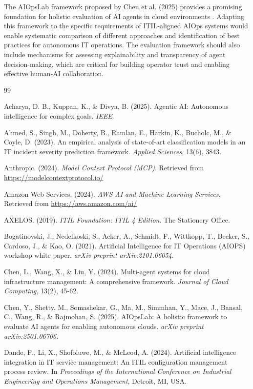 \documentclass{article}
\begin{document}
The AIOpsLab framework proposed by Chen et al. (2025) provides a promising foundation for holistic evaluation of AI agents in cloud environments \cite{chen2025}. Adapting this framework to the specific requirements of ITIL-aligned AIOps systems would enable systematic comparison of different approaches and identification of best practices for autonomous IT operations. The evaluation framework should also include mechanisms for assessing explainability and transparency of agent decision-making, which are critical for building operator trust and enabling effective human-AI collaboration.


\begin{thebibliography}{99}

Acharya, D. B., Kuppan, K., \& Divya, B. (2025). Agentic AI: Autonomous intelligence for complex goals. \textit{IEEE}.

Ahmed, S., Singh, M., Doherty, B., Ramlan, E., Harkin, K., Bucholc, M., \& Coyle, D. (2023). An empirical analysis of state-of-art classification models in an IT incident severity prediction framework. \textit{Applied Sciences}, 13(6), 3843.

Anthropic. (2024). \textit{Model Context Protocol (MCP)}. Retrieved from \url{https://modelcontextprotocol.io/}

Amazon Web Services. (2024). \textit{AWS AI and Machine Learning Services}. Retrieved from \url{https://aws.amazon.com/ai/}

AXELOS. (2019). \textit{ITIL Foundation: ITIL 4 Edition}. The Stationery Office.

Bogatinovski, J., Nedelkoski, S., Acker, A., Schmidt, F., Wittkopp, T., Becker, S., Cardoso, J., \& Kao, O. (2021). Artificial Intelligence for IT Operations (AIOPS) workshop white paper. \textit{arXiv preprint arXiv:2101.06054}.

Chen, L., Wang, X., \& Liu, Y. (2024). Multi-agent systems for cloud infrastructure management: A comprehensive framework. \textit{Journal of Cloud Computing}, 13(2), 45-62.

Chen, Y., Shetty, M., Somashekar, G., Ma, M., Simmhan, Y., Mace, J., Bansal, C., Wang, R., \& Rajmohan, S. (2025). AIOpsLab: A holistic framework to evaluate AI agents for enabling autonomous clouds. \textit{arXiv preprint arXiv:2501.06706}.

Dande, F., Li, X., Shofoluwe, M., \& McLeod, A. (2024). Artificial intelligence integration in IT service management: An ITIL configuration management process review. In \textit{Proceedings of the International Conference on Industrial Engineering and Operations Management}, Detroit, MI, USA.


\end{thebibliography}
\end{document}

